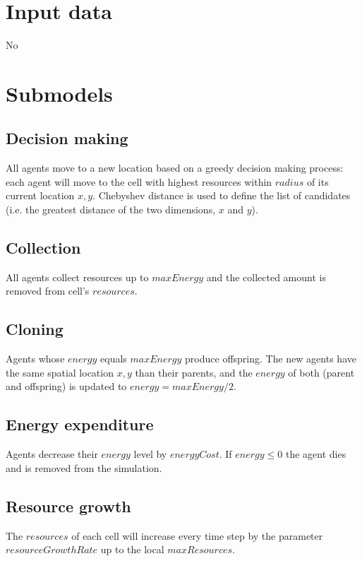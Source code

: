 \message{ !name(odd_decision_making.tex)}\documentclass[11pt,a4paper,twocolumn,notitlepage]{article}
\begin{document}
\section{Input data}

No

\section{Submodels}

\subsection{Decision making}

All agents move to a new location based on a greedy decision making process: each agent will move to the cell with highest resources within $radius$ of its current location $x,y$. Chebyshev distance is used to define the list of candidates (i.e. the greatest distance of the two dimensions, $x$ and $y$).

\subsection{Collection}

All agents collect resources up to $maxEnergy$ and the collected amount is removed from cell's $resources$. 

\subsection{Cloning}

Agents whose $energy$ equals $maxEnergy$ produce offspring. The new agents have the same spatial location $x,y$ than their parents, and the $energy$ of both (parent and offspring) is updated to $energy = maxEnergy/2$.

\subsection{Energy expenditure}

Agents decrease their $energy$ level by $energyCost$. If $energy \leq 0$ the agent dies and is removed from the simulation.

\subsection{Resource growth}

The $resources$ of each cell will increase every time step by the parameter $resourceGrowthRate$ up to the local $maxResources$.
\end{document}
